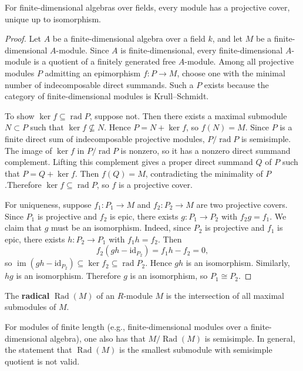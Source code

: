\begin{prop}
For finite-dimensional algebras over fields, every module has a projective cover, unique up to isomorphism.
\end{prop}
\begin{proof}
Let \( A \) be a finite-dimensional algebra over a field \( k \), and let \( M \) be a finite-dimensional \( A \)-module.  
Since \( A \) is finite-dimensional, every finite-dimensional \( A \)-module is a quotient of a finitely generated free \( A \)-module. Among all projective modules \( P \) admitting an epimorphism \( f:P\to M \), choose one with the minimal number of indecomposable direct summands. Such a \( P \) exists because the category of finite-dimensional modules is Krull--Schmidt.

To show \(\ker f\subseteq \operatorname{rad} P\), suppose not. Then there exists a maximal submodule \(N\subset P\) such that \(\ker f\not\subseteq N\). Hence \(P=N+\ker f\), so \(f(N)=M\). Since \(P\) is a finite direct sum of indecomposable projective modules, \(P/\operatorname{rad}P\) is semisimple. The image of \(\ker f\) in \(P/\operatorname{rad}P\) is nonzero, so it has a nonzero direct summand complement. Lifting this complement gives a proper direct summand \(Q\) of \(P\) such that \(P=Q+\ker f\). Then \(f(Q)=M\), contradicting the minimality of \(P\).Therefore \( \ker f \subseteq \operatorname{rad} P \), so \( f \) is a projective cover.

For uniqueness, suppose \( f_1 : P_1 \to M \) and \( f_2 : P_2 \to M \) are two projective covers. Since \( P_1 \) is projective and \( f_2 \) is epic, there exists \( g : P_1 \to P_2 \) with \( f_2 g = f_1 \).  
We claim that \(g\) must be an isomorphism. Indeed, since \(P_2\) is projective and \(f_1\) is epic, there exists \(h:P_2\to P_1\) with \(f_1h=f_2\). Then
\[
f_2(gh-\mathrm{id}_{P_2})=f_1h-f_2=0,
\]
so \(\operatorname{im}(gh-\mathrm{id}_{P_2})\subseteq \ker f_2\subseteq \operatorname{rad}P_2\). Hence \(gh\) is an isomorphism. Similarly, \(hg\) is an isomorphism. Therefore \(g\) is an isomorphism, so \(P_1\cong P_2\).
\end{proof}

\begin{defn}[Radical]
The \textbf{radical} \(\operatorname{Rad}(M)\) of an \(R\)-module \(M\) is the intersection of all maximal submodules of \(M\).

For modules of finite length (e.g., finite-dimensional modules over a finite-dimensional algebra), one also has that \(M/\operatorname{Rad}(M)\) is semisimple. In general, the statement that \(\operatorname{Rad}(M)\) is the smallest submodule with semisimple quotient is not valid.
\end{defn}

